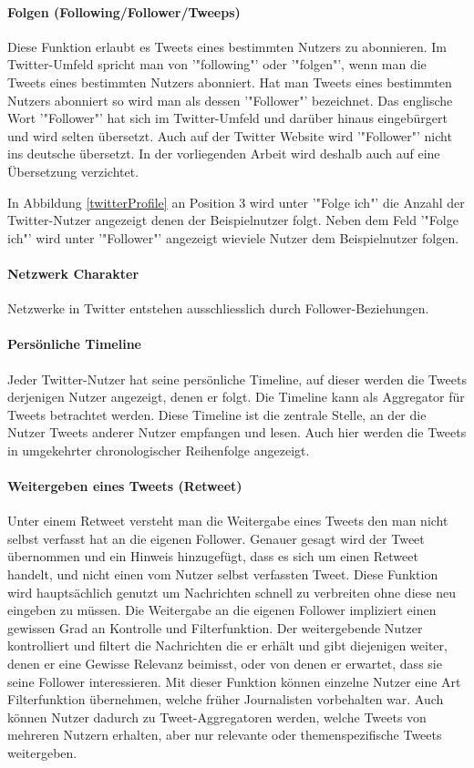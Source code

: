 		\paragraph{Folgen (Following/Follower/Tweeps)}
			Diese Funktion erlaubt es Tweets eines bestimmten Nutzers zu abonnieren. 
			Im Twitter-Umfeld spricht man von '"following"' oder '"folgen"', wenn man die Tweets eines bestimmten Nutzers abonniert.
			Hat man Tweets eines bestimmten Nutzers abonniert so wird man als dessen '"Follower"' bezeichnet. 
			Das englische Wort '"Follower"' hat sich im Twitter-Umfeld und darüber hinaus eingebürgert und wird selten übersetzt. 
			Auch auf der Twitter Website wird '"Follower"' nicht ins deutsche übersetzt.
			In der vorliegenden Arbeit wird deshalb auch auf eine Übersetzung verzichtet. 

			In Abbildung \ref{twitterProfile} an Position 3 wird unter '"Folge ich"' die Anzahl der Twitter-Nutzer angezeigt denen der Beispielnutzer folgt. 
			Neben dem Feld '"Folge ich"' wird unter '"Follower"' angezeigt wieviele Nutzer dem Beispielnutzer folgen.

		\paragraph{Netzwerk Charakter}
			Netzwerke in Twitter entstehen ausschliesslich durch Follower-Beziehungen.

		\paragraph{Persönliche Timeline}
			Jeder Twitter-Nutzer hat seine persönliche Timeline, auf dieser werden die Tweets derjenigen Nutzer angezeigt, denen er folgt. 
			Die Timeline kann als Aggregator für Tweets betrachtet werden.
			Diese Timeline ist die zentrale Stelle, an der die Nutzer Tweets anderer Nutzer empfangen und lesen.
			Auch hier werden die Tweets in umgekehrter chronologischer Reihenfolge angezeigt.  

		\paragraph{Weitergeben eines Tweets (Retweet)}
			Unter einem Retweet versteht man die Weitergabe eines Tweets den man nicht selbst verfasst hat an die eigenen Follower.
			Genauer gesagt wird der Tweet übernommen und ein Hinweis hinzugefügt, dass es sich um einen Retweet handelt, und nicht einen vom Nutzer selbst verfassten Tweet.
			Diese Funktion wird hauptsächlich genutzt um Nachrichten schnell zu verbreiten ohne diese neu eingeben zu müssen. 
			Die Weitergabe an die eigenen Follower impliziert einen gewissen Grad an Kontrolle und Filterfunktion.
			Der weitergebende Nutzer kontrolliert und filtert die Nachrichten die er erhält und gibt diejenigen weiter, denen er eine Gewisse Relevanz beimisst, oder von denen er erwartet, dass sie seine Follower interessieren.  
			Mit dieser Funktion können einzelne Nutzer eine Art Filterfunktion übernehmen, welche früher Journalisten vorbehalten war. 
			Auch können Nutzer dadurch zu Tweet-Aggregatoren werden, welche Tweets von mehreren Nutzern erhalten, aber nur relevante oder themenspezifische Tweets weitergeben.


